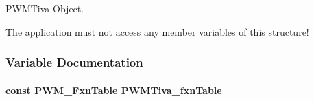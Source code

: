 P\+W\+M\+Tiva Object. 

The application must not access any member variables of this structure! 

\subsubsection{Variable Documentation}
\paragraph[{P\+W\+M\+Tiva\+\_\+fxn\+Table}]{\setlength{\rightskip}{0pt plus 5cm}const {\bf P\+W\+M\+\_\+\+Fxn\+Table} P\+W\+M\+Tiva\+\_\+fxn\+Table}\label{_p_w_m_tiva_8h_ae9b8f538f1e9e857629220104addd24a}
